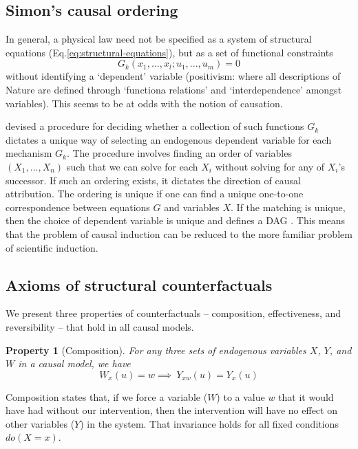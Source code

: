 \documentclass[11pt]{article}
\numberwithin{equation}{section}
\newtheorem{prop}{Property}[section]
\begin{document}
\subsection{Simon's causal ordering}

In general, a physical law need not be specified as a system of structural equations (Eq.\ref{eq:structural-equations}), but as a set of functional constraints
\begin{equation}
G_k(x_1,...,x_l; u_1,...,u_m) = 0
\end{equation}
without identifying a `dependent' variable (positivism: where all descriptions of Nature are defined through `functiona relations' and `interdependence' amongst variables). This seems to be at odds with the notion of causation.

\cite{Simon77} devised a procedure for deciding whether a collection of such functions $G_k$ dictates a unique way of selecting an endogenous dependent variable for each mechanism $G_k$. The procedure involves finding an order of variables $(X_1,...,X_n)$ such that we can solve for each $X_i$ without solving for any of $X_i$'s successor. If such an ordering exists, it dictates the direction of causal attribution. The ordering is unique if one can find a unique one-to-one correspondence between equations $G$ and variables $X$. If the matching is unique, then the choice of dependent variable is unique and defines a DAG \citep{Nayak94}. This means that the problem of causal induction can be reduced to the more familiar problem of scientific induction.

\subsection{Axioms of structural counterfactuals}
We present three properties of counterfactuals -- composition, effectiveness, and reversibility -- that hold in all causal models.

\begin{prop}[Composition] \label{prop:composition}
For any three sets of endogenous variables $X$, $Y$, and $W$ in a causal model, we have
\begin{equation}
W_x(u) = w \implies\ Y_{xw}(u) = Y_x(u)
\end{equation}
\end{prop}

Composition states that, if we force a variable ($W$) to a value $w$ that it would have had without our intervention, then the intervention will have no effect on other variables ($Y$) in the system. That invariance holds for all fixed conditions $do(X=x)$.
\end{document}
